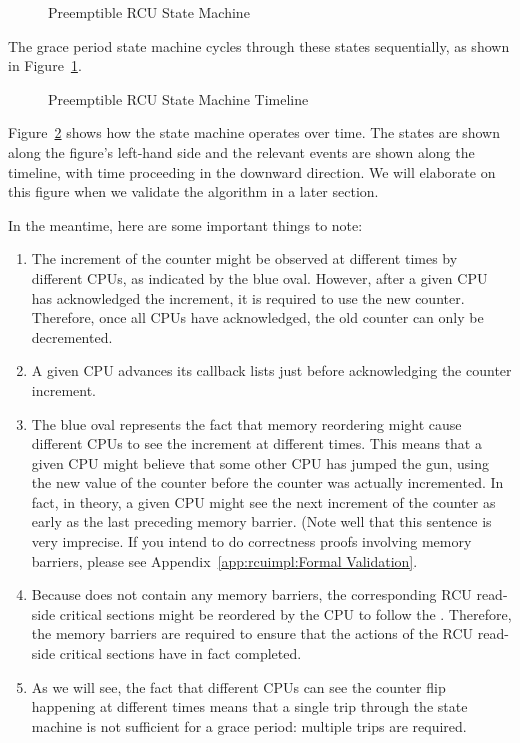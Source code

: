 \begin{figure}[htb]
\centering
{}
\caption{Preemptible RCU State Machine}
\label{app:rcuimpl:Preemptible RCU State Machine}
\end{figure}

The grace period state machine cycles through these states sequentially,
as shown in
Figure~\ref{app:rcuimpl:Preemptible RCU State Machine}.

\begin{figure}[htb]
\centering
{}
\caption{Preemptible RCU State Machine Timeline}
\label{app:rcuimpl:Preemptible RCU State Machine Timeline}
\end{figure}

Figure~\ref{app:rcuimpl:Preemptible RCU State Machine Timeline}
shows how the state machine operates over time.
The states are shown along the figure's left-hand side and the relevant events
are shown along the timeline, with time proceeding in the downward direction.
We will elaborate on this figure when we validate the algorithm in
a later section.

In the meantime, here are some important things to note:

\begin{enumerate}
\item	The increment of the  counter
	might be observed at different times by different CPUs, as
	indicated by the blue oval.  However, after a given
	CPU has acknowledged the increment, it is required to
	use the new counter.
	Therefore, once all CPUs have acknowledged, the old counter
	can only be decremented.
\item	A given CPU advances its callback lists just before
	acknowledging the counter increment.
\item	The blue oval represents the fact that memory reordering
	might cause different CPUs to see the increment at
	different times.
	This means that a given CPU might believe that some
	other CPU has jumped the gun, using the new value of the counter
	before the counter was actually incremented.
	In fact, in theory, a given CPU might see the next increment of the
	 counter as early as
	the last preceding memory barrier.
	(Note well that this sentence is very imprecise.
	If you intend to do correctness proofs involving memory barriers,
	please see Appendix~\ref{app:rcuimpl:Formal Validation}.
\item	Because  does not contain any
	memory barriers, the corresponding RCU read-side critical
	sections might be reordered by the CPU to follow the
	.
	Therefore, the memory barriers are required to ensure
	that the actions of the RCU read-side critical sections
	have in fact completed.
\item	As we will see, the fact that different CPUs can see the
	counter flip happening at different times means that a
	single trip through the state machine is not sufficient
	for a grace period: multiple trips are required.
\end{enumerate}

